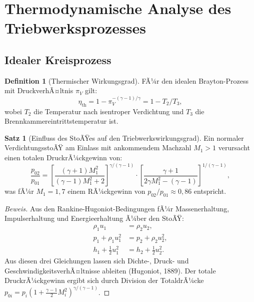 ﻿\documentclass[12pt,a4paper]{article}
\theoremstyle{definition}
\newtheorem{definition}{Definition}[section]
\newtheorem{satz}{Satz}[section]
\theoremstyle{remark}
\newenvironment{beweis}{\begin{proof}[Beweis]}{\end{proof}}
\begin{document}
\section{Thermodynamische Analyse des Triebwerksprozesses}
\label{sec:thermodynamik}

\subsection{Idealer Kreisprozess}

\begin{definition}[Thermischer Wirkungsgrad]
  FÃ¼r den idealen Brayton-Prozess mit DruckverhÃ¤ltnis $\pi_V$ gilt:
  \begin{equation}
    \eta_\text{th} = 1 - \pi_V^{-(\gamma-1)/\gamma} = 1 - T_2/T_3,
    \label{eq:brayton}
  \end{equation}
  wobei $T_2$ die Temperatur nach isentroper Verdichtung und $T_3$ die Brennkammereintrittstemperatur
  ist.
\end{definition}

\begin{satz}[Einfluss des StoÃŸes auf den Triebwerkswirkungsgrad]
  \label{satz:stossverlust}
  Ein normaler VerdichtungsstoÃŸ am Einlass mit ankommendem Machzahl $M_1 > 1$ verursacht
  einen totalen DruckrÃ¼ckgewinn von:
  \begin{equation}
    \frac{p_{02}}{p_{01}} = \left[\frac{(\gamma+1)M_1^2}{(\gamma-1)M_1^2 + 2}\right]^{\gamma/(\gamma-1)}
    \cdot \left[\frac{\gamma+1}{2\gamma M_1^2 - (\gamma-1)}\right]^{1/(\gamma-1)},
    \label{eq:druckrÃ¼ckgewinn}
  \end{equation}
  was fÃ¼r $M_1 = 1{,}7$ einem RÃ¼ckgewinn von $p_{02}/p_{01} \approx 0{,}86$ entspricht.
\end{satz}

\begin{beweis}
  Aus den Rankine-Hugoniot-Bedingungen fÃ¼r Massenerhaltung, Impulserhaltung und
  Energieerhaltung Ã¼ber den StoÃŸ:
  \begin{align}
    \rho_1 u_1 &= \rho_2 u_2, \\
    p_1 + \rho_1 u_1^2 &= p_2 + \rho_2 u_2^2, \\
    h_1 + \tfrac{1}{2}u_1^2 &= h_2 + \tfrac{1}{2}u_2^2.
  \end{align}
  Aus diesen drei Gleichungen lassen sich Dichte-, Druck- und GeschwindigkeitsverhÃ¤ltnisse
  ableiten (Hugoniot, 1889). Der totale DruckrÃ¼ckgewinn ergibt sich durch Division der
  TotaldrÃ¼cke $p_{0i} = p_i(1 + \tfrac{\gamma-1}{2}M_i^2)^{\gamma/(\gamma-1)}$. \qedhere
\end{beweis}
\end{document}
